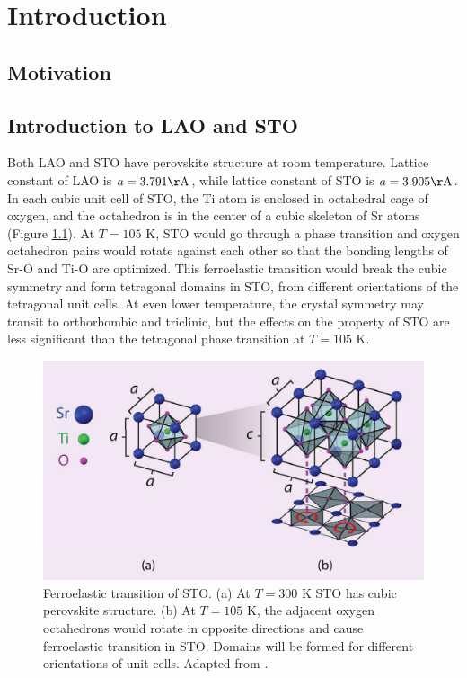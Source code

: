\documentclass[pdflatex, sectionletters, 12pt]{pittetd}    %
\begin{document}
\chapter{Introduction}%

\section{Motivation}



\section{Introduction to LAO and STO}

Both LAO and STO have perovskite structure at room temperature. Lattice constant of LAO is $a = 3.791\mathrm{\AA}$\cite{geller1956crystallographic}, while lattice constant of STO is $a = 3.905\mathrm{\AA}$. In each cubic unit cell of STO, the Ti atom is enclosed in octahedral cage of oxygen, and the octahedron is in the center of a cubic skeleton of Sr atoms (Figure \ref{FIG:STOPhaseTransition}). At $T=105$ K, STO would go through a phase transition and oxygen octahedron pairs would rotate against each other so that the bonding lengths of Sr-O and Ti-O are optimized\cite{sulpizio2014nanoscale}. This ferroelastic transition would break the cubic symmetry and form tetragonal domains in STO, from different orientations of the tetragonal unit cells. At even lower temperature, the crystal symmetry may transit to orthorhombic and triclinic, but the effects on the property of STO are less significant than the tetragonal phase transition at $T=105$ K.

\begin{figure}[h!]
	\centering
	\includegraphics[width=.90\textwidth]{Drawing/STOPhaseTransition.pdf}
	\caption{Ferroelastic transition of STO. (a) At $T=300$ K STO has cubic perovskite structure. (b) At $T = 105$ K, the adjacent oxygen octahedrons would rotate in opposite directions and cause ferroelastic transition in STO. Domains will be formed for different orientations of unit cells. Adapted from \cite{sulpizio2014nanoscale}.}
	\label{FIG:STOPhaseTransition}
\end{figure}
\end{document}
